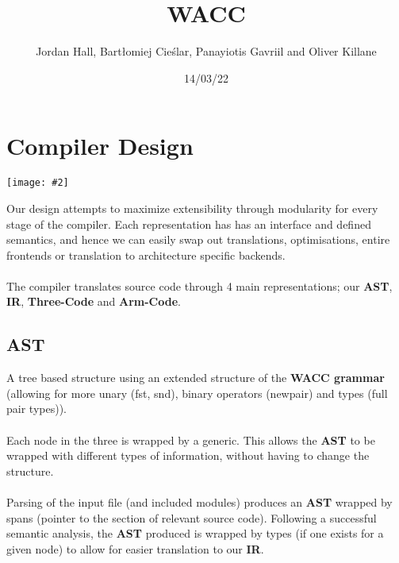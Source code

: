 \documentclass{article}
\title{WACC}
\author{Jordan Hall, Bartłomiej Cieślar, Panayiotis Gavriil and Oliver Killane}
\date{14/03/22}
\newcommand{\centerimage}[2]{\begin{center}
    \texttt{[image: \#2]}
\end{center}}
\newcommand{\keyword}[1]{\textbf{#1}}
\begin{document}
    \maketitle

    \section*{Compiler Design}
        \centerimage{0.9}{Compiler Map}
        Our design attempts to maximize extensibility through modularity for every stage 
        of the compiler. Each representation has has an interface and defined semantics, 
        and hence we can easily swap out translations, optimisations, entire frontends or 
        translation to architecture specific backends.
        \\
        \\ The compiler translates source code through 4 main representations; our \keyword{AST}, \keyword{IR}, \keyword{Three-Code} and \keyword{Arm-Code}.

        \subsection*{AST}
            A tree based structure using an extended structure of the \keyword{WACC grammar} 
            (allowing for more unary (fst, snd), binary operators (newpair) and types (full 
            pair types)).
            \\
            \\ Each node in the three is wrapped by a generic. This allows the \keyword{AST} to 
            be wrapped with different types of information, without having to change the structure.
            \\
            \\ Parsing of the input file (and included modules) produces an \keyword{AST} wrapped by 
            spans (pointer to the section of relevant source code). Following a successful semantic 
            analysis, the \keyword{AST} produced is wrapped by types (if one exists for a given node) 
            to allow for easier translation to our \keyword{IR}.
        
\end{document}
